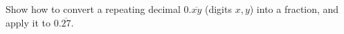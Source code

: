 Show how to convert a repeating decimal $0.\overline{xy}$ (digits $x,y$) into a fraction, and apply it to $0.\overline{27}$.
